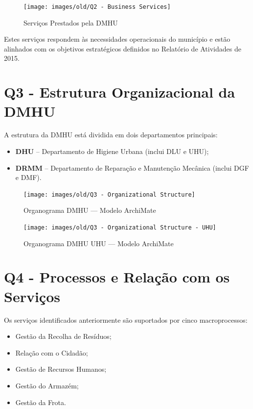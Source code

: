 \documentclass[12pt,a4paper,final]{article}
\begin{document}
    \begin{figure}[H]
        \centering
        \texttt{[image: images/old/Q2 - Business Services]}
        \caption{Serviços Prestados pela DMHU}
        \label{fig:2}
    \end{figure}

    Estes serviços respondem às necessidades operacionais do município e estão alinhados com os objetivos estratégicos definidos no Relatório de Atividades de 2015.

    \section*{Q3 - Estrutura Organizacional da DMHU}\label{sec:estrutura-organizacional-da-dmhu}
    A estrutura da DMHU está dividida em dois departamentos principais:
    \begin{itemize}
        \item \textbf{DHU} – Departamento de Higiene Urbana (inclui DLU e UHU);
        \item \textbf{DRMM} – Departamento de Reparação e Manutenção Mecânica (inclui DGF e DMF).
    \end{itemize}

    \begin{figure}[H]
        \centering
        \texttt{[image: images/old/Q3 - Organizational Structure]}
        \caption{Organograma DMHU — Modelo ArchiMate}
        \label{fig:3}
    \end{figure}

    \begin{figure}[H]
        \centering
        \texttt{[image: images/old/Q3 - Organizational Structure - UHU]}
        \caption{Organograma DMHU UHU — Modelo ArchiMate}
        \label{fig:10}
    \end{figure}

    \newpage

    \section*{Q4 - Processos e Relação com os Serviços}\label{sec:processos-e-relacao-com-os-servicos}
    Os serviços identificados anteriormente são suportados por cinco macroprocessos:
    \begin{itemize}
        \item Gestão da Recolha de Resíduos;
        \item Relação com o Cidadão;
        \item Gestão de Recursos Humanos;
        \item Gestão do Armazém;
        \item Gestão da Frota.
    \end{itemize}
\end{document}

